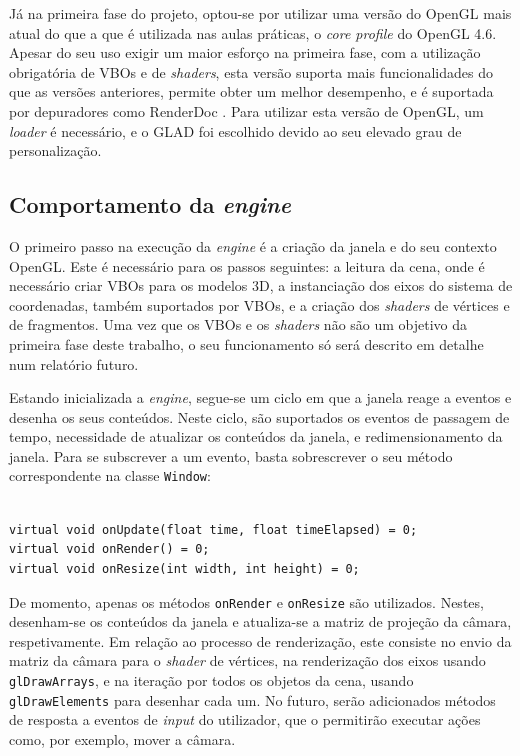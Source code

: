 \documentclass[12pt, a4paper]{article}
\begin{document}
Já na primeira fase do projeto, optou-se por utilizar uma versão do OpenGL mais atual do que a que é
utilizada nas aulas práticas, o \emph{core profile} do OpenGL 4.6. Apesar do seu uso exigir um maior
esforço na primeira fase, com a utilização obrigatória de VBOs e de \emph{shaders}, esta versão
suporta mais funcionalidades do que as versões anteriores, permite obter um melhor desempenho, e é
suportada por depuradores como RenderDoc \cite{renderdoc}. Para utilizar esta versão de OpenGL, um
\emph{loader} é necessário, e o GLAD \cite{glad} foi escolhido devido ao seu elevado grau de
personalização.

\subsection{Comportamento da \emph{engine}}

O primeiro passo na execução da \emph{engine} é a criação da janela e do seu contexto OpenGL. Este é
necessário para os passos seguintes: a leitura da cena, onde é necessário criar VBOs para os
modelos 3D, a instanciação dos eixos do sistema de coordenadas, também suportados por VBOs, e a
criação dos \emph{shaders} de vértices e de fragmentos. Uma vez que os VBOs e os \emph{shaders} não
são um objetivo da primeira fase deste trabalho, o seu funcionamento só será descrito em detalhe num
relatório futuro.

Estando inicializada a \emph{engine}, segue-se um ciclo em que a janela reage a eventos e desenha os
seus conteúdos. Neste ciclo, são suportados os eventos de passagem de tempo, necessidade de
atualizar os conteúdos da janela, e redimensionamento da janela. Para se subscrever a um evento,
basta sobrescrever o seu método correspondente na classe \texttt{Window}:

\begin{lstlisting}

virtual void onUpdate(float time, float timeElapsed) = 0;
virtual void onRender() = 0;
virtual void onResize(int width, int height) = 0;
\end{lstlisting}

De momento, apenas os métodos \texttt{onRender} e \texttt{onResize} são utilizados. Nestes,
desenham-se os conteúdos da janela e atualiza-se a matriz de projeção da câmara, respetivamente. Em
relação ao processo de renderização, este consiste no envio da matriz da câmara para o \emph{shader}
de vértices, na renderização dos eixos usando \texttt{glDrawArrays}, e na iteração por todos os
objetos da cena, usando \texttt{glDrawElements} para desenhar cada um. No futuro, serão adicionados
métodos de resposta a eventos de \emph{input} do utilizador, que o permitirão executar ações como,
por exemplo, mover a câmara.
\end{document}
